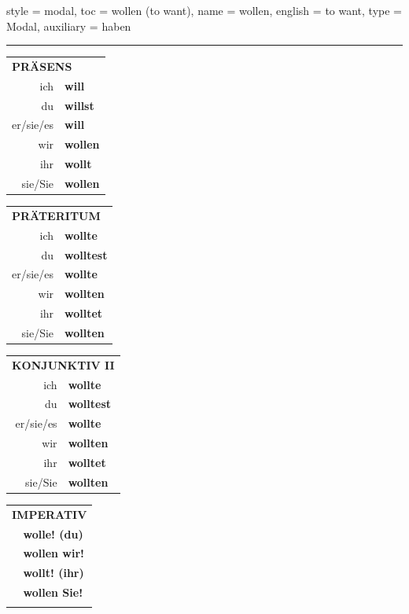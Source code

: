 \begin{verbentry}{
  style = {modal},
  toc = {wollen (to want)},
  name = {wollen},
  english = {to want},
  type = {Modal},
  auxiliary = {haben}
}
 
     \vspace{5pt}
    \hrule
    \vspace{5pt}
  \begin{tabular}{rl}
     \multicolumn{2}{l}{\textbf{PRÄSENS} }\\
    ich & \textbf{will}\\
    du & \textbf{willst}\\
    er/sie/es & \textbf{will}\\
    wir & \textbf{wollen}\\
    ihr & \textbf{wollt}\\
    sie/Sie & \textbf{wollen}\\
  \end{tabular}
  \hfill
     \begin{tabular}{rl}
    \multicolumn{2}{l}{\textbf{PRÄTERITUM} }\\
    ich & \textbf{wollte}\\
    du & \textbf{wolltest}\\
    er/sie/es & \textbf{wollte}\\
    wir & \textbf{wollten}\\
    ihr & \textbf{wolltet}\\
    sie/Sie & \textbf{wollten}\\
  \end{tabular}
   \hfill
     \begin{tabular}{rl}
    \multicolumn{2}{l}{\textbf{KONJUNKTIV II} }\\
    ich & \textbf{wollte}\\
    du & \textbf{wolltest}\\
    er/sie/es & \textbf{wollte}\\
    wir & \textbf{wollten}\\
    ihr & \textbf{wolltet}\\
    sie/Sie & \textbf{wollten}\\
  \end{tabular}
  \hfill
  \begin{tabular}{rl}
     \multicolumn{2}{l}{\textbf{IMPERATIV} }\\
   & \textbf{wolle! (du)}\\
   & \textbf{wollen wir!}\\
   & \textbf{wollt! (ihr)}\\
   & \textbf{wollen Sie!}\\
   & \vspace{10pt}
  \end{tabular}


\end{verbentry}
